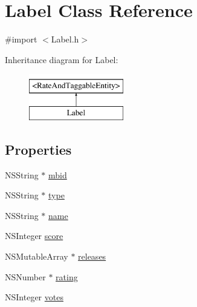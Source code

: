 \hypertarget{interface_label}{\section{Label Class Reference}
\label{interface_label}
}


{\ttfamily \#import $<$Label.\-h$>$}

Inheritance diagram for Label\-:\begin{figure}[H]
\begin{center}
\leavevmode
\includegraphics[height=2.000000cm]{interface_label}
\end{center}
\end{figure}
\subsection*{Properties}
\begin{DoxyCompactItemize}
\item 
N\-S\-String $\ast$ \hyperlink{interface_label_ac99c300dad91b65fd16a5fa70ac9d0cd}{mbid}
\item 
N\-S\-String $\ast$ \hyperlink{interface_label_a39681f294f4f2e3a9ff0ef26c0defaa8}{type}
\item 
N\-S\-String $\ast$ \hyperlink{interface_label_a9c5be437d44dfd330c79cf02069f3b74}{name}
\item 
N\-S\-Integer \hyperlink{interface_label_a72644ac0d9f87057b72a7567df74dfb4}{score}
\item 
N\-S\-Mutable\-Array $\ast$ \hyperlink{interface_label_a44589900a9b8fde292b1dd619b7b08cb}{releases}
\item 
N\-S\-Number $\ast$ \hyperlink{interface_label_aa06dc0c1090f55c31cba64c51d5b7395}{rating}
\item 
N\-S\-Integer \hyperlink{interface_label_a59de345af4c1d302b04ad1205e5ab5b6}{votes}
\end{DoxyCompactItemize}


